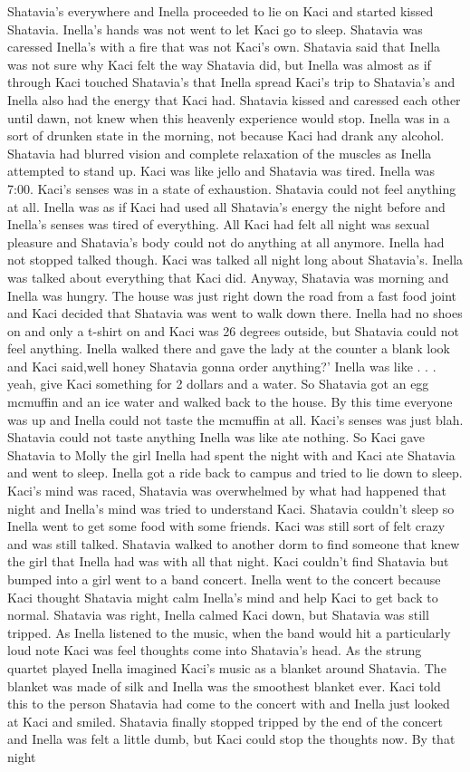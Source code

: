 \documentclass[12pt]{book}
\begin{document}
Shatavia's everywhere and Inella proceeded to lie on Kaci and started kissed Shatavia. Inella's hands was not went to let Kaci go to sleep. Shatavia was caressed Inella's with a fire that was not Kaci's own. Shatavia said that Inella was not sure why Kaci felt the way Shatavia did, but Inella was almost as if through Kaci touched Shatavia's that Inella spread Kaci's trip to Shatavia's and Inella also had the energy that Kaci had. Shatavia kissed and caressed each other until dawn, not knew when this heavenly experience would stop. Inella was in a sort of drunken state in the morning, not because Kaci had drank any alcohol. Shatavia had blurred vision and complete relaxation of the muscles as Inella attempted to stand up. Kaci was like jello and Shatavia was tired. Inella was 7:00. Kaci's senses was in a state of exhaustion. Shatavia could not feel anything at all. Inella was as if Kaci had used all Shatavia's energy the night before and Inella's senses was tired of everything. All Kaci had felt all night was sexual pleasure and Shatavia's body could not do anything at all anymore. Inella had not stopped talked though. Kaci was talked all night long about Shatavia's. Inella was talked about everything that Kaci did. Anyway, Shatavia was morning and Inella was hungry. The house was just right down the road from a fast food joint and Kaci decided that Shatavia was went to walk down there. Inella had no shoes on and only a t-shirt on and Kaci was 26 degrees outside, but Shatavia could not feel anything. Inella walked there and gave the lady at the counter a blank look and Kaci said,well honey Shatavia gonna order anything?' Inella was like . . .  yeah, give Kaci something for 2 dollars and a water. So Shatavia got an egg mcmuffin and an ice water and walked back to the house. By this time everyone was up and Inella could not taste the mcmuffin at all. Kaci's senses was just blah. Shatavia could not taste anything Inella was like ate nothing. So Kaci gave Shatavia to Molly the girl Inella had spent the night with and Kaci ate Shatavia and went to sleep. Inella got a ride back to campus and tried to lie down to sleep. Kaci's mind was raced, Shatavia was overwhelmed by what had happened that night and Inella's mind was tried to understand Kaci. Shatavia couldn't sleep so Inella went to get some food with some friends. Kaci was still sort of felt crazy and was still talked. Shatavia walked to another dorm to find someone that knew the girl that Inella had was with all that night. Kaci couldn't find Shatavia but bumped into a girl went to a band concert. Inella went to the concert because Kaci thought Shatavia might calm Inella's mind and help Kaci to get back to normal. Shatavia was right, Inella calmed Kaci down, but Shatavia was still tripped. As Inella listened to the music, when the band would hit a particularly loud note Kaci was feel thoughts come into Shatavia's head. As the strung quartet played Inella imagined Kaci's music as a blanket around Shatavia. The blanket was made of silk and Inella was the smoothest blanket ever. Kaci told this to the person Shatavia had come to the concert with and Inella just looked at Kaci and smiled. Shatavia finally stopped tripped by the end of the concert and Inella was felt a little dumb, but Kaci could stop the thoughts now. By that night 
\end{document}
